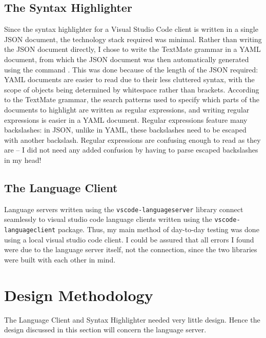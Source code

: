 \documentclass[../main.tex]{subfiles}
\begin{document}
\subsection{The Syntax Highlighter}
Since the syntax highlighter for a Visual Studio Code client is written in a single JSON document, the technology stack required was minimal. Rather than writing the JSON document directly, I chose to write the TextMate grammar in a YAML document, from which the JSON document was then automatically generated using the command  \cite{yq_repo}. This was done because of the length of the JSON required: YAML documents are easier to read due to their less cluttered syntax, with the scope of objects being determined by whitespace rather than brackets. According to the TextMate grammar, the search patterns used to specify which parts of the documents to highlight are written as regular expressions, and writing regular expressions is easier in a YAML document. Regular expressions feature many backslashes: in JSON, unlike in YAML, these backslashes need to be escaped with another backslash. Regular expressions are confusing enough to read as they are -- I did not need any added confusion by having to parse escaped backslashes in my head!

\subsection{The Language Client}
Language servers written using the \texttt{vscode-languageserver} library connect seamlessly to visual studio code language clients written using the \texttt{vscode-languageclient} package. Thus, my main method of day-to-day testing was done using a local visual studio code client. I could be assured that all errors I found were due to the language server itself, not the connection, since the two libraries were built with each other in mind. 
%
%
%
\section{Design Methodology}
The Language Client and Syntax Highlighter needed very little design. Hence the design discussed in this section will concern the language server.
\end{document}
